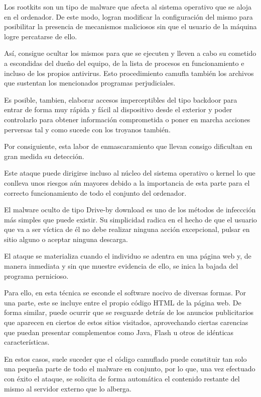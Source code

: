 Los rootkits son un tipo de malware que afecta al sistema operativo que se aloja en el ordenador. De este modo, logran modificar la configuración del mismo para posibilitar la presencia de mecanismos maliciosos sin que el usuario de la máquina logre percatarse de ello.

Así, consigue ocultar los mismos para que se ejecuten y lleven a cabo su cometido a escondidas del dueño del equipo, de la lista de procesos en funcionamiento e incluso de los propios antivirus. Esto procedimiento camufla también los archivos que sustentan los mencionados programas perjudiciales.

Es posible, tambien, elaborar accesos imperceptibles del tipo backdoor para entrar de forma muy rápida y fácil al dispositivo desde el exterior y poder controlarlo para obtener información comprometida o poner en marcha acciones perversas tal y como sucede con los troyanos también.

Por consiguiente, esta labor de enmascaramiento que llevan consigo dificultan en gran medida su detección.

Este ataque puede dirigirse incluso al núcleo del sistema operativo o kernel lo que conlleva unos riesgos aún mayores debido a la importancia de esta parte para el correcto funcionamiento de todo el conjunto del ordenador.

El malware oculto de tipo Drive-by download es uno de los métodos de infeccción más simples que puede existir. Su simplicidad radica en el hecho de que el usuario que va a ser víctica de él no debe realizar ninguna acción excepcional, pulsar en sitio alguno o aceptar ninguna descarga.

El ataque se materializa cuando el individuo se adentra en una página web y, de manera inmediata y sin que muestre evidencia de ello, se inica la bajada del programa pernicioso.

Para ello, en esta técnica se esconde el software nocivo de diversas formas. Por una parte, este se incluye entre el propio código HTML de la página web. De forma similar, puede ocurrir que se resguarde detrás de los anuncios publicitarios que aparecen en ciertos de estos sitios visitados, aprovechando ciertas carencias que puedan presentar complementos como Java, Flash u otros de idénticas características.

En estos casos, suele suceder que el código camuflado puede constituir tan solo una pequeña parte de todo el malware en conjunto, por lo que, una vez efectuado con éxito el ataque, se solicita de forma automática el contenido restante del mismo al servidor externo que lo alberga.

